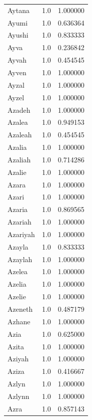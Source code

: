 \documentclass[
  letterpaper,
  DIV=11,
  numbers=noendperiod]{scrreprt}
\begin{document}
\begin{tabular}{lrr}
Aytana          &   1.0 &   1.000000 \\
Ayumi           &   1.0 &   0.636364 \\
Ayushi          &   1.0 &   0.833333 \\
Ayva            &   1.0 &   0.236842 \\
Ayvah           &   1.0 &   0.454545 \\
Ayven           &   1.0 &   1.000000 \\
Ayzal           &   1.0 &   1.000000 \\
Ayzel           &   1.0 &   1.000000 \\
Azadeh          &   1.0 &   1.000000 \\
Azalea          &   1.0 &   0.949153 \\
Azaleah         &   1.0 &   0.454545 \\
Azalia          &   1.0 &   1.000000 \\
Azaliah         &   1.0 &   0.714286 \\
Azalie          &   1.0 &   1.000000 \\
Azara           &   1.0 &   1.000000 \\
Azari           &   1.0 &   1.000000 \\
Azaria          &   1.0 &   0.869565 \\
Azariah         &   1.0 &   1.000000 \\
Azariyah        &   1.0 &   1.000000 \\
Azayla          &   1.0 &   0.833333 \\
Azaylah         &   1.0 &   1.000000 \\
Azelea          &   1.0 &   1.000000 \\
Azelia          &   1.0 &   1.000000 \\
Azelie          &   1.0 &   1.000000 \\
Azeneth         &   1.0 &   0.487179 \\
Azhane          &   1.0 &   1.000000 \\
Azia            &   1.0 &   0.625000 \\
Azita           &   1.0 &   1.000000 \\
Aziyah          &   1.0 &   1.000000 \\
Aziza           &   1.0 &   0.416667 \\
Azlyn           &   1.0 &   1.000000 \\
Azlynn          &   1.0 &   1.000000 \\
Azra            &   1.0 &   0.857143 \\

\end{tabular}
\end{document}
